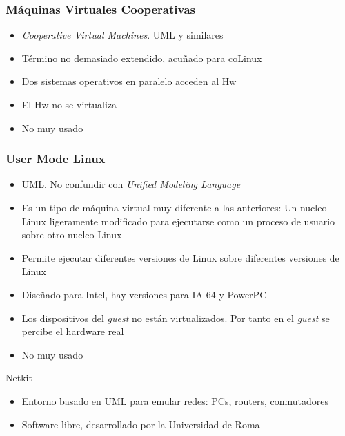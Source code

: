 \documentclass[ucs]{beamer}
\begin{document}
\begin{frame}[fragile]
\frametitle{Máquinas Virtuales Cooperativas}
\begin{itemize}
\item
\emph{Cooperative Virtual Machines}. 
UML y similares
\item
Término no demasiado extendido, acuñado para
coLinux

\item
Dos sistemas operativos en paralelo acceden al Hw
\item
El Hw no se virtualiza

\item
No muy usado
\end{itemize}

\end{frame}



\begin{frame}[fragile]

\frametitle{User Mode Linux}
\begin{itemize}	
\item UML. No confundir con \emph{Unified Modeling Language}
\item
Es un tipo de máquina virtual muy diferente a las anteriores: Un
nucleo Linux ligeramente modificado para ejecutarse como un proceso 
de usuario sobre otro nucleo Linux
\item 
Permite ejecutar diferentes versiones de Linux sobre
diferentes versiones de Linux
\item 
Diseñado para Intel, hay versiones para IA-64 y PowerPC
\item 
Los dispositivos del \emph{guest} no están virtualizados.
Por tanto en el \emph{guest} se percibe el hardware real
\item 
No muy usado

\end{itemize}

\end{frame}


\begin{frame}[fragile]
Netkit
\begin{itemize}	
\item
Entorno basado en UML para emular redes: PCs, routers, conmutadores
\item 
Software libre, desarrollado por la Universidad de Roma
\end{itemize}


\end{frame}
\end{document}
